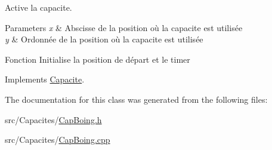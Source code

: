 Active la capacite. 


\begin{DoxyParams}{Parameters}
{\em x} & Abscisse de la position où la capacite est utilisée \\
\hline
{\em y} & Ordonnée de la position où la capacite est utilisée\\
\hline
\end{DoxyParams}
Fonction Initialise la position de départ et le timer 

Implements \mbox{\hyperlink{class_capacite_abac1434e2ac3ecc9e5afdafd9a7a4bed}{Capacite}}.



The documentation for this class was generated from the following files\+:\begin{DoxyCompactItemize}
\item 
src/\+Capacites/\mbox{\hyperlink{_cap_boing_8h}{Cap\+Boing.\+h}}\item 
src/\+Capacites/\mbox{\hyperlink{_cap_boing_8cpp}{Cap\+Boing.\+cpp}}\end{DoxyCompactItemize}
